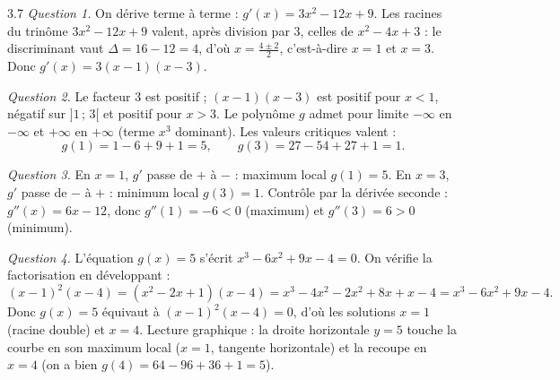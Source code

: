 \begin{corrige}{3.7}
\emph{Question 1.} On dérive terme à terme : $g'(x) = 3x^{2} - 12x + 9$. Les racines du trinôme $3x^{2} - 12x + 9$ valent, après division par $3$, celles de $x^{2} - 4x + 3$ : le discriminant vaut $\Delta = 16 - 12 = 4$, d'où $x = \frac{4 \pm 2}{2}$, c'est-à-dire $x = 1$ et $x = 3$. Donc $g'(x) = 3(x-1)(x-3)$.

\emph{Question 2.} Le facteur $3$ est positif ; $(x-1)(x-3)$ est positif pour $x < 1$, négatif sur $]1\,;\,3[$ et positif pour $x > 3$. Le polynôme $g$ admet pour limite $-\infty$ en $-\infty$ et $+\infty$ en $+\infty$ (terme $x^{3}$ dominant). Les valeurs critiques valent :
\[
g(1) = 1 - 6 + 9 + 1 = 5, \qquad g(3) = 27 - 54 + 27 + 1 = 1.
\]

\begin{center}
\end{center}

\emph{Question 3.} En $x = 1$, $g'$ passe de $+$ à $-$ : maximum local $g(1) = 5$. En $x = 3$, $g'$ passe de $-$ à $+$ : minimum local $g(3) = 1$. Contrôle par la dérivée seconde : $g''(x) = 6x - 12$, donc $g''(1) = -6 < 0$ (maximum) et $g''(3) = 6 > 0$ (minimum).

\emph{Question 4.} L'équation $g(x) = 5$ s'écrit $x^{3} - 6x^{2} + 9x - 4 = 0$. On vérifie la factorisation en développant :
\[
(x-1)^{2}(x-4) = (x^{2} - 2x + 1)(x - 4) = x^{3} - 4x^{2} - 2x^{2} + 8x + x - 4 = x^{3} - 6x^{2} + 9x - 4.
\]
Donc $g(x) = 5$ équivaut à $(x-1)^{2}(x-4) = 0$, d'où les solutions $x = 1$ (racine double) et $x = 4$. Lecture graphique : la droite horizontale $y = 5$ touche la courbe en son maximum local ($x = 1$, tangente horizontale) et la recoupe en $x = 4$ (on a bien $g(4) = 64 - 96 + 36 + 1 = 5$).
\end{corrige}

